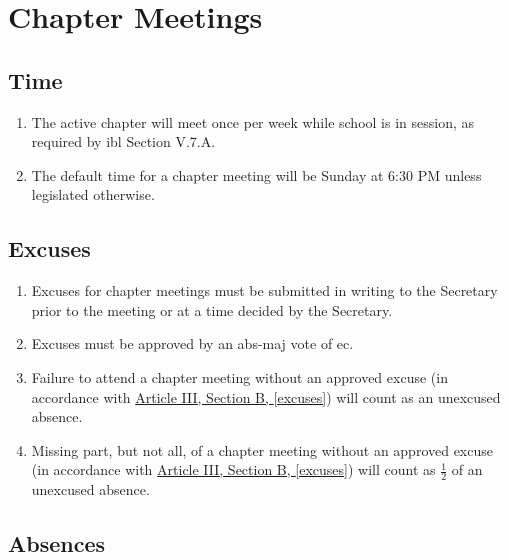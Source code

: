 \chapter{Chapter Meetings}

\section{Time}

	\begin{enumerate}
		\item The active chapter will meet once per week while school is in session, as required by \gls{ibl} Section V.7.A. 

		\item The default time for a chapter meeting will be Sunday at 6:30 PM unless legislated otherwise.

	\end{enumerate}

\section{Excuses}

	\begin{enumerate}
		\item Excuses for chapter meetings must be submitted in writing to the
		Secretary prior to the meeting or at a time decided by the Secretary. \label{excuses}

		\item Excuses must be approved by an \gls{abs-maj} vote of \gls{ec}.

		\item Failure to \gls{attend} a chapter meeting without an approved excuse (in accordance with \hyperref[excuses]{Article III, Section B, \autoref*{excuses}}) will count as an unexcused absence.

		\item Missing part, but not all, of a chapter meeting without an approved excuse (in accordance with \hyperref[excuses]{Article III, Section B, \autoref*{excuses}}) will count as $\frac{1}{2}$ of an unexcused absence.

	\end{enumerate}

\section{Absences}
	\label{attendance}

